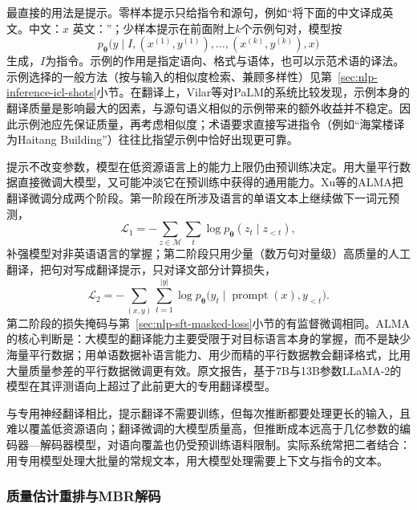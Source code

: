 最直接的用法是提示。零样本提示只给指令和源句，例如“将下面的中文译成英文。中文：$x$ 英文：”；少样本提示在前面附上$k$个示例句对，模型按
\begin{equation}
  p_{\bm\theta}\bigl(y\mid I,(x^{(1)},y^{(1)}),\ldots,(x^{(k)},y^{(k)}),x\bigr)
  \label{eq:nlp-generation-llm-mt-prompt}
\end{equation}
生成，$I$为指令。示例的作用是指定语向、格式与语体，也可以示范术语的译法。示例选择的一般方法（按与输入的相似度检索、兼顾多样性）见第~\ref{sec:nlp-inference-icl-shots}小节。在翻译上，Vilar等对PaLM的系统比较发现，示例本身的翻译质量是影响最大的因素，与源句语义相似的示例带来的额外收益并不稳定。因此示例池应先保证质量，再考虑相似度；术语要求直接写进指令（例如“海棠楼译为Haitang Building”）往往比指望示例中恰好出现更可靠。

提示不改变参数，模型在低资源语言上的能力上限仍由预训练决定。用大量平行数据直接微调大模型，又可能冲淡它在预训练中获得的通用能力。Xu等的ALMA把翻译微调分成两个阶段。第一阶段在所涉及语言的单语文本上继续做下一词元预测，
\begin{equation}
  \mathcal L_1=-\sum_{z\in\mathcal M}\sum_{t}\log p_{\bm\theta}(z_t\mid z_{<t}),
  \label{eq:nlp-generation-alma-stage1}
\end{equation}
补强模型对非英语语言的掌握；第二阶段只用少量（数万句对量级）高质量的人工翻译，把句对写成翻译提示，只对译文部分计算损失，
\begin{equation}
  \mathcal L_2=-\sum_{(x,y)}\sum_{t=1}^{|y|}\log p_{\bm\theta}\bigl(y_t\mid \operatorname{prompt}(x),y_{<t}\bigr).
  \label{eq:nlp-generation-alma-stage2}
\end{equation}
第二阶段的损失掩码与第~\ref{sec:nlp-sft-masked-loss}小节的有监督微调相同。ALMA的核心判断是：大模型的翻译能力主要受限于对目标语言本身的掌握，而不是缺少海量平行数据；用单语数据补语言能力、用少而精的平行数据教会翻译格式，比用大量质量参差的平行数据微调更有效。原文报告，基于7B与13B参数LLaMA-2的模型在其评测语向上超过了此前更大的专用翻译模型。

与专用神经翻译相比，提示翻译不需要训练，但每次推断都要处理更长的输入，且难以覆盖低资源语向；翻译微调的大模型质量高，但推断成本远高于几亿参数的编码器—解码器模型，对语向覆盖也仍受预训练语料限制。实际系统常把二者结合：用专用模型处理大批量的常规文本，用大模型处理需要上下文与指令的文本。

\subsubsection{质量估计重排与MBR解码}
\label{sec:nlp-generation-qe-mbr}

